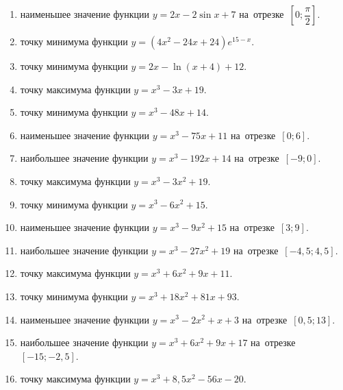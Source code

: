 \documentclass[a4paper,10pt]{article}
\begin{document}
\begin{enumerate}
\item {} наименьшее значение функции $y=2x-2\sin x +7$ на~отрезке~$\left[0;\dfrac{\pi }{2}\right]$.

\item {} точку минимума функции $y=\left(4x^2-24x+24\right){{e}^{15-x}}$.

\item {} точку минимума функции $y=2x-\ln \left(x+4\right)+12$.

\item {} точку максимума функции $y=x^3 -3x +19$.

\item {} точку минимума функции $y=x^3 -48x+14$.

\item {} наименьшее значение функции $y=x^3 -75x+11$ на~отрезке~$\left[0;6\right]$.

\item {} наибольшее значение функции $y=x^3 -192x+14$ на~отрезке~$\left[-9;0\right]$.

\item {} точку максимума функции $y=x^3 -3x^2+19$.

\item {} точку минимума функции $y=x^3 -6x^2+15$.

\item {} наименьшее значение функции $y=x^3 -9x^2+15$ на~отрезке~$\left[3;9\right]$.

\item {} наибольшее значение функции $y=x^3 -27x^2+19$ на~отрезке~$\left[-4,5;4,5\right]$.

\item {} точку максимума функции $y=x^3 +6x^2+9x+11$.

\item {} точку минимума функции $y=x^3 +18x^2+81x+93$.

\item {} наименьшее значение функции $y=x^3 -2x^2+x+3$ на~отрезке~$\left[0,5;13\right]$.

\item {} наибольшее значение функции $y=x^3 +6x^2+9x+17$ на~отрезке~$\left[-15;-2,5\right]$.

\item {} точку максимума функции $y=x^3 +8,5x^2-56x-20$.


\end{enumerate}
\end{document}
